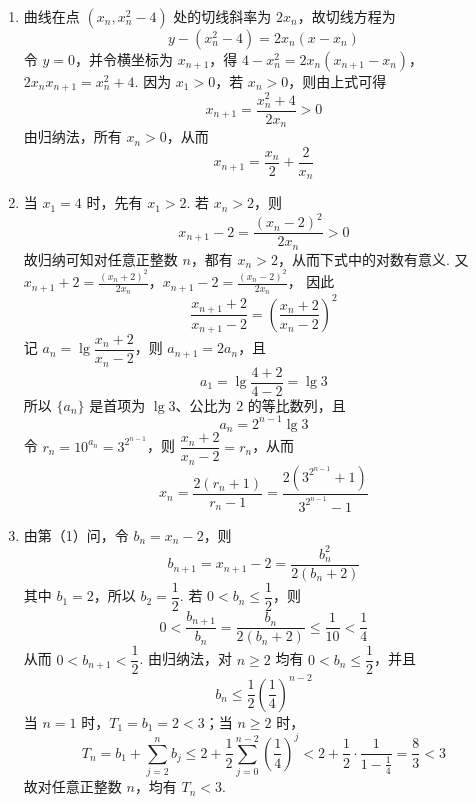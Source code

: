 \begin{solution}
\begin{enumerate}
\item 曲线在点 \((x_{n},x_{n}^{2}-4)\) 处的切线斜率为 \(2x_{n}\)，故切线方程为
\[
y-(x_{n}^{2}-4)=2x_{n}(x-x_{n})
\]
令 \(y=0\)，并令横坐标为 \(x_{n+1}\)，得
\(4-x_{n}^{2}=2x_{n}(x_{n+1}-x_{n})\)，\(2x_{n}x_{n+1}=x_{n}^{2}+4\).
因为 \(x_{1}>0\)，若 \(x_{n}>0\)，则由上式可得
\[
x_{n+1}=\frac{x_{n}^{2}+4}{2x_{n}}>0
\]
由归纳法，所有 \(x_{n}>0\)，从而
\[
x_{n+1}=\frac{x_{n}}2+\frac{2}{x_{n}}
\]
\item 当 \(x_{1}=4\) 时，先有 \(x_{1}>2\). 若 \(x_{n}>2\)，则
\[
x_{n+1}-2=\frac{(x_{n}-2)^{2}}{2x_{n}}>0
\]
故归纳可知对任意正整数 \(n\)，都有 \(x_{n}>2\)，从而下式中的对数有意义. 又
\(x_{n+1}+2=\frac{(x_{n}+2)^{2}}{2x_{n}}\)，\(x_{n+1}-2=\frac{(x_{n}-2)^{2}}{2x_{n}}\)，
因此
\[
\frac{x_{n+1}+2}{x_{n+1}-2}=\left(\frac{x_{n}+2}{x_{n}-2}\right)^{2}
\]
记 \(a_{n}=\lg\dfrac{x_{n}+2}{x_{n}-2}\)，则 \(a_{n+1}=2a_{n}\)，且
\[
a_{1}=\lg\frac{4+2}{4-2}=\lg3
\]
所以 \(\{a_{n}\}\) 是首项为 \(\lg3\)、公比为 \(2\) 的等比数列，且
\[
a_{n}=2^{n-1}\lg3
\]
令 \(r_{n}=10^{a_{n}}=3^{2^{n-1}}\)，则 \(\dfrac{x_{n}+2}{x_{n}-2}=r_{n}\)，从而
\[
x_{n}=\frac{2(r_{n}+1)}{r_{n}-1}
=\frac{2\left(3^{2^{n-1}}+1\right)}{3^{2^{n-1}}-1}
\]
\item 由第（1）问，令 \(b_{n}=x_{n}-2\)，则
\[
b_{n+1}=x_{n+1}-2=\frac{b_{n}^{2}}{2(b_{n}+2)}
\]
其中 \(b_{1}=2\)，所以 \(b_{2}=\dfrac12\). 若 \(0<b_{n}\leqslant\dfrac12\)，则
\[
0<\frac{b_{n+1}}{b_{n}}=\frac{b_{n}}{2(b_{n}+2)}\leqslant\frac1{10}<\frac14
\]
从而 \(0<b_{n+1}<\dfrac12\). 由归纳法，对 \(n\geqslant2\) 均有 \(0<b_{n}\leqslant\dfrac12\)，并且
\[
b_{n}\leqslant\frac12\left(\frac14\right)^{n-2}
\]
当 \(n=1\) 时，\(T_{1}=b_{1}=2<3\)；当 \(n\geqslant2\) 时，
\[
T_{n}=b_{1}+\sum_{j=2}^{n}b_{j}
\leqslant2+\frac12\sum_{j=0}^{n-2}\left(\frac14\right)^{j}
<2+\frac12\cdot\frac{1}{1-\frac14}=\frac83<3
\]
故对任意正整数 \(n\)，均有 \(T_{n}<3\).
\end{enumerate}
\end{solution}
